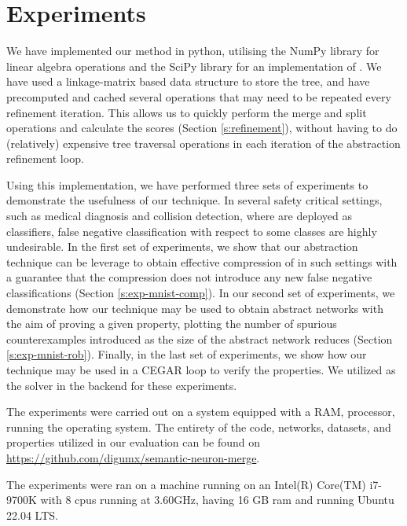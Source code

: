 \section{Experiments}

We have implemented our method in python, utilising the NumPy \cite{numpy}
library for linear algebra operations and the SciPy \cite{scipy} library for an
implementation of \hcluster.
We have used a linkage-matrix \cite{scipy-hcluster-linkage}  based
data structure to store the tree, and have precomputed and cached several
operations that may need to be repeated every refinement iteration. This allows
us to quickly perform the merge and split operations and calculate the
scores (Section \ref{s:refinement}), without having to do (relatively)
expensive tree traversal operations in each iteration of the abstraction
refinement loop. 

Using this implementation, we have performed three sets of experiments to
demonstrate the usefulness of our technique. In several safety critical
settings, such as medical diagnosis and collision detection, where \dnn are
deployed as classifiers, false negative classification with respect to some
classes are highly undesirable. In the first set of experiments, we show that
our abstraction technique can be leverage to obtain effective compression of
\dnn in such settings with a guarantee that the compression does not introduce
any new false negative classifications (Section \ref{s:exp-mnist-comp}). In our
second set of experiments, we demonstrate how our technique may be used to
obtain abstract networks with the aim of proving a given property, plotting the
number of spurious counterexamples introduced as the size of the abstract
network reduces (Section \ref{s:exp-mnist-rob}). Finally, in the last set of
experiments, we show how our technique may be used in a CEGAR loop
\cite{cegar-nn} to verify the \acasxu properties. We utilized \abcrown as the 
solver in the backend for these experiments.


The experiments were carried out on a system equipped with a  RAM,
 processor, running the  operating system. 
The entirety of the code, networks, datasets, and properties utilized in our 
evaluation can be found on \href{https://github.com/digumx/semantic-neuron-merge}{https://github.com/digumx/semantic-neuron-merge}.



The experiments were ran on a machine running on an Intel(R) Core(TM) i7-9700K
with 8 cpus running at 3.60GHz, having 16 GB ram and running Ubuntu 22.04 LTS.

